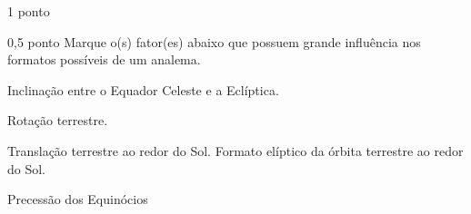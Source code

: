 \documentclass{../lista}
\begin{document}
\begin{questao}{1 ponto}
		\begin{pergunta}{0,5 ponto}
			Marque o(s) fator(es) abaixo que possuem grande influência nos formatos possíveis de um analema.


			\begin{alternativas}
				\alternativaMarcada Inclinação entre o Equador Celeste e a Eclíptica.
				\item Rotação terrestre.
				\item Translação terrestre ao redor do Sol.
				\alternativaMarcada Formato elíptico da órbita terrestre ao redor do Sol.
				\item Precessão dos Equinócios
			\end{alternativas}
		\end{pergunta}
	\end{questao}
	
	\encerramento
\end{document}
